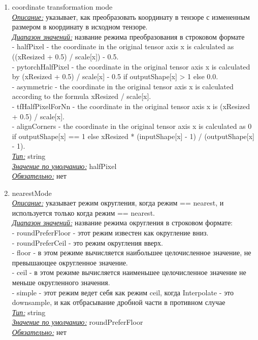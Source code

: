 \documentclass{article}
\begin{document}
\begin{enumerate}
        \item coordinate transformation mode\\
        
        \underline{\textit{Описание:}} указывает, как преобразовать координату в тензоре с измененным размером в координату в исходном тензоре.\\
        \underline{\textit{Диапазон значений:}} название режима преобразования в строковом формате\\
        - halfPixel - the coordinate in the original tensor axis x is calculated as ((xResized + 0.5) / scale[x]) - 0.5.\\
        - pytorchHalfPixel - the coordinate in the original tensor axis x is calculated by (xResized + 0.5) / scale[x] - 0.5 if outputShape[x] > 1 else 0.0.\\
        - asymmetric - the coordinate in the original tensor axis x is calculated according to the formula xResized / scale[x].\\
        - tfHalfPixelForNn - the coordinate in the original tensor axis x is (xResized + 0.5) / scale[x].\\
        - alignCorners - the coordinate in the original tensor axis x is calculated as 0 if outputShape[x] == 1 else xResized * (inputShape[x] - 1) / (outputShape[x] - 1).\\
        \underline{\textit{Тип:}} string\\
        \underline{\textit{Значение по умолчанию:}} halfPixel\\
        \underline{\textit{Обязательно:}} нет\\

        \item nearestMode\\
        
        \underline{\textit{Описание:}} указывает режим округления, когда режим == nearest, и используется только когда режим == nearest.\\
        \underline{\textit{Диапазон значений:}} название режима округления в строковом формате:\\
        - roundPreferFloor - этот режим известен как округление вниз.\\
        - roundPreferCeil - это режим округления вверх.\\
        - floor - в этом режиме вычисляется наибольшее целочисленное значение, не превышающее округленное значение.\\
        - ceil - в этом режиме вычисляется наименьшее целочисленное значение не меньше округленного значения.\\
        - simple - этот режим ведет себя как режим ceil, когда Interpolate - это downsample, и как отбрасывание дробной части в противном случае\\
        \underline{\textit{Тип:}} string\\
        \underline{\textit{Значение по умолчанию:}} roundPreferFloor\\
        \underline{\textit{Обязательно:}} нет\\
        

\end{enumerate}
\end{document}
